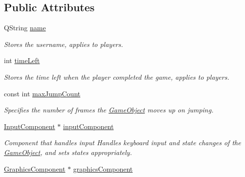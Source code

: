 \subsection*{Public Attributes}
\begin{DoxyCompactItemize}
\item 
\hypertarget{classGameObject_a05bfcec90c5fd5579ae901ad09919b12}{Q\-String \hyperlink{classGameObject_a05bfcec90c5fd5579ae901ad09919b12}{name}}\label{classGameObject_a05bfcec90c5fd5579ae901ad09919b12}

\begin{DoxyCompactList}\small\item\em Stores the username, applies to players. \end{DoxyCompactList}\item 
\hypertarget{classGameObject_a6ca856e43814c856465e252c2620b4fd}{int \hyperlink{classGameObject_a6ca856e43814c856465e252c2620b4fd}{time\-Left}}\label{classGameObject_a6ca856e43814c856465e252c2620b4fd}

\begin{DoxyCompactList}\small\item\em Stores the time left when the player completed the game, applies to players. \end{DoxyCompactList}\item 
\hypertarget{classGameObject_a32194bfeb8fa7c182b461b3d81f5b4f8}{const int \hyperlink{classGameObject_a32194bfeb8fa7c182b461b3d81f5b4f8}{max\-Jump\-Count}}\label{classGameObject_a32194bfeb8fa7c182b461b3d81f5b4f8}

\begin{DoxyCompactList}\small\item\em Specifies the number of frames the \hyperlink{classGameObject}{Game\-Object} moves up on jumping. \end{DoxyCompactList}\item 
\hypertarget{classGameObject_a5d0f552ee77c70c8f28b11dd792bf5e9}{\hyperlink{classInputComponent}{Input\-Component} $\ast$ \hyperlink{classGameObject_a5d0f552ee77c70c8f28b11dd792bf5e9}{input\-Component}}\label{classGameObject_a5d0f552ee77c70c8f28b11dd792bf5e9}

\begin{DoxyCompactList}\small\item\em Component that handles input Handles keyboard input and state changes of the \hyperlink{classGameObject}{Game\-Object}, and sets states appropriately. \end{DoxyCompactList}\item 
\hypertarget{classGameObject_abb548a6a6010953cded6906801ef4d2b}{\hyperlink{classGraphicsComponent}{Graphics\-Component} $\ast$ \hyperlink{classGameObject_abb548a6a6010953cded6906801ef4d2b}{graphics\-Component}}\label{classGameObject_abb548a6a6010953cded6906801ef4d2b}


\end{DoxyCompactItemize}
